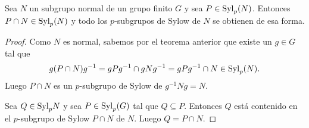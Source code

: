 %
%
%

\begin{theorem}
	Sea $N$ un subgrupo normal de un grupo finito $G$ y sea $P\in\mathrm{Syl}_p(N)$. Entonces 
	$P\cap N\in\mathrm{Syl}_p(N)$ y todo los $p$-subgrupos de Sylow de $N$ se obtienen
	de esa forma. 
\end{theorem}

\begin{proof}
	Como $N$ es normal, 
	sabemos por el teorema anterior que existe un $g\in G$ tal que
	\[
		g(P\cap N)g^{-1}=gPg^{-1}\cap gNg^{-1}=gPg^{-1}\cap N\in\mathrm{Syl}_p(N).
	\]
	Luego $P\cap N$ es un $p$-subgrupo de Sylow de $g^{-1}Ng=N$. 
	
	Sea $Q\in\mathrm{Syl}_pN$ y sea $P\in\mathrm{Syl}_p(G)$ tal que $Q\subseteq P$. Entonces
	$Q$ está contenido en el $p$-subgrupo de Sylow $P\cap N$ de $N$. Luego
	$Q=P\cap N$.
\end{proof}

